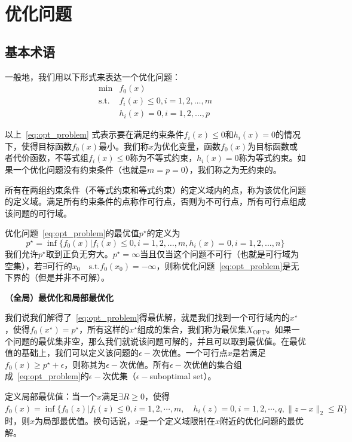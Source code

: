 \documentclass[12pt,a4paper]{book}
\begin{document}
\section{优化问题}

\subsection{基本术语}

一般地，我们用以下形式来表达一个优化问题：
\begin{equation}
    \begin{aligned}
        \min & f_0(x) \\
        \text{s.t.} & f_i(x)\leq 0 ,i = 1,2,\dots,m\\
        & h_i(x)=0,i = 1,2,\dots,p
    \end{aligned}
    \label{eq:opt_problem}
\end{equation}

以上~\eqref{eq:opt_problem} 式表示要在满足约束条件$f_i(x)\leq 0$和$h_i(x)=0$的情况下，使得目标函数$f_0(x)$最小。我们称$x$为优化变量，函数$f_0(x)$为目标函数或者代价函数，不等式组$f_i(x)\leq 0$称为不等式约束，$h_i(x)=0$称为等式约束。如果一个优化问题没有约束条件（也就是$m=p=0$），我们称之为无约束的。

所有在两组约束条件（不等式约束和等式约束）的定义域内的点，称为该优化问题的定义域。满足所有约束条件的点称作可行点，否则为不可行点，所有可行点组成该问题的可行域。

优化问题~\eqref{eq:opt_problem}的最优值$p^\star $的定义为
$$p^\star = \inf\{f_0(x)|f_i(x) \leq 0, i = 1, 2, \ldots, m,h_i(x) = 0, i = 1, 2, \ldots, n\}$$
我们允许$p^\star$取到正负无穷大。$p^\star=\infty$当且仅当这个问题不可行（也就是可行域为空集），若$\exists \text{可行的}x_0 \quad\text{s.t.} f_0(x_0)=-\infty$，则称优化问题~\eqref{eq:opt_problem}是无下界的（但是并非不可解）。

\textbf{（全局）最优化和局部最优化}

我们说我们解得了~\eqref{eq:opt_problem}得最优解，就是我们找到一个可行域内的$x^\star$，使得$f_0(x^\star)=p^\star$，所有这样的$x^\star$组成的集合，我们称为最优集$X_{\text{OPT}}$。如果一个问题的最优集非空，那么我们就说该问题可解的，并且可以取到最优值。在最优值的基础上，我们可以定义该问题的$\epsilon-$次优值。一个可行点$x$是若满足$f_0(x)\geq p^\star+\epsilon$，则称其为$\epsilon-$次优值。所有$\epsilon-$次优值的集合组成~\eqref{eq:opt_problem}的$\epsilon-$次优集（$\epsilon-$suboptimal set）。

定义局部最优值：当一个$x$满足$\exists R\ge 0$，使得$f_0(x)=\inf\{f_0(z)|f_i(z)\leq 0 ,i=1,2,\cdots,m,\quad h_i(z)=0,i=1,2,\cdots,q,\| z - x \|_2 \le R\}$时，则$x$为局部最优值。换句话说，$x$是一个定义域限制在$x$附近的优化问题的最优解。
\end{document}
